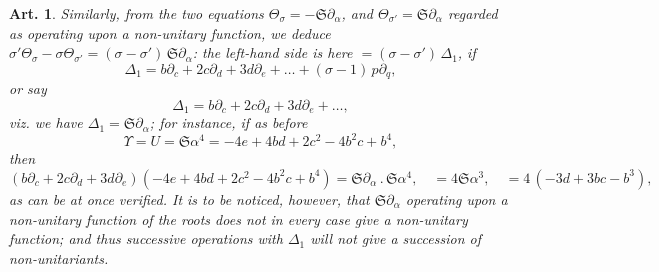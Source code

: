 \documentclass[11pt,a4paper]{article}
\theoremstyle{cayley}
\newtheorem{art}{Art.}[section]
\begin{document}
\setcounter{art}{22}
\begin{art}
Similarly, from the two equations $\Theta_{\sigma} = -\mathfrak{S}\partial_{\alpha}$, and $\Theta_{\sigma'} = \mathfrak{S}\partial_{\alpha}$ regarded as operating upon a non-unitary function, we deduce $\sigma'\Theta_{\sigma} - \sigma\Theta_{\sigma'} = (\sigma - \sigma')\,\mathfrak{S}\partial_{\alpha}$: the left-hand side is here $= (\sigma - \sigma')\,\Delta_{1}$, if
\[
\Delta_{1} = b\partial_{c} + 2c\partial_{d} + 3d\partial_{e} + \ldots + (\sigma-1)\,p\partial_{q},
\]
or say
\[
\Delta_{1} = b\partial_{c} + 2c\partial_{d} + 3d\partial_{e} + \ldots,
\]
viz. we have $\Delta_{1} = \mathfrak{S}\partial_{\alpha}$; for instance, if as before
\[
\Upsilon = U = \mathfrak{S}\alpha^{4} = -4e + 4bd + 2c^{2} - 4b^{2}c + b^{4},
\]
then
\[
(b\partial_{c} + 2c\partial_{d} + 3d\partial_{e})(-4e + 4bd + 2c^{2} - 4b^{2}c + b^{4}) = \mathfrak{S}\partial_{\alpha}\,.\,\mathfrak{S}\alpha^{4},\quad = 4\mathfrak{S}\alpha^{3},\quad = 4\,(-3d + 3bc - b^{3}),
\]
as can be at once verified. It is to be noticed, however, that $\mathfrak{S}\partial_{\alpha}$ operating upon a non-unitary function of the roots does not in every case give a non-unitary function; and thus successive operations with $\Delta_{1}$ will not give a succession of non-unitariants.
\end{art}
\end{document}
